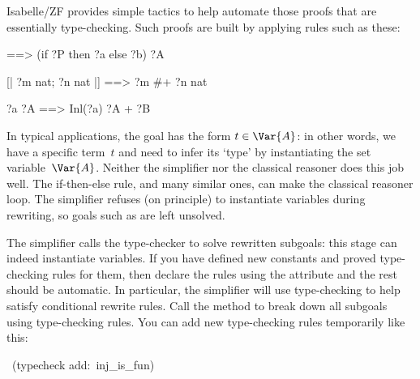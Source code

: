 Isabelle/ZF provides simple tactics to help automate those proofs that are
essentially type-checking.  Such proofs are built by applying rules such as
these:
\begin{ttbox}\isastyleminor
[| ?P ==> ?a \isasymin ?A; ~?P ==> ?b \isasymin ?A |] 
==> (if ?P then ?a else ?b) \isasymin ?A

[| ?m \isasymin nat; ?n \isasymin nat |] ==> ?m #+ ?n \isasymin nat

?a \isasymin ?A ==> Inl(?a) \isasymin ?A + ?B  
\end{ttbox}
In typical applications, the goal has the form $t\in\Var{A}$: in other words,
we have a specific term~$t$ and need to infer its `type' by instantiating the
set variable~$\Var{A}$.  Neither the simplifier nor the classical reasoner
does this job well.  The if-then-else rule, and many similar ones, can make
the classical reasoner loop.  The simplifier refuses (on principle) to
instantiate variables during rewriting, so goals such as 
are left unsolved.

The simplifier calls the type-checker to solve rewritten subgoals: this stage
can indeed instantiate variables.  If you have defined new constants and
proved type-checking rules for them, then declare the rules using
the attribute  and the rest should be automatic.  In
particular, the simplifier will use type-checking to help satisfy
conditional rewrite rules. Call the method  to
break down all subgoals using type-checking rules. You can add new
type-checking rules temporarily like this:
\begin{isabelle}
\ (typecheck add:\ inj_is_fun)
\end{isabelle}


